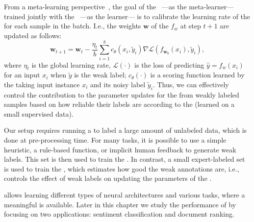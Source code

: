 From a meta-learning perspective~\citep{Andrychowicz:2016,Finn2017:ICML,Ravi:2016}, the goal of the \cnet\ ---as the meta-learner--- trained jointly with the \tnet\ ---as the learner--- is to calibrate the learning rate of the \tnet for each sample in the batch. I.e., the weights $\pmb{w}$ of the \tnet $f_w$ at step $t+1$ are updated as follows:
\begin{equation}
\pmb{w}_{t+1} = \pmb{w}_t - \frac{\eta_t}{b}\sum_{i=1}^b c_{\theta}(x_i, \tilde{y}_i)  \nabla \mathcal{L}(f_{\pmb{w_t}}(x_i), \tilde{y}_i),
\end{equation}
where $\eta_t$ is the global learning rate, $\mathcal{L}(\cdot)$ is the loss of predicting $\hat{y}=f_w(x_i)$ for an input $x_i$ when $\tilde{y}$ is the weak label; $c_\theta(\cdot)$ is a scoring function learned by the \cnet taking input instance $x_i$ and its noisy label $\tilde{y}_i$. Thus, we can effectively control the contribution to the parameter updates for the \tnet from weakly labeled samples based on how reliable their labels are according to the \cnet (learned on a small supervised data).

Our setup requires running a \wa to label a large amount of unlabeled data, which is done at pre-processing time. For many tasks, it is possible to use a simple heuristic, a rule-based function, or implicit human feedback to generate weak labels. This set is then used to train the \tnet.  
In contrast, a small expert-labeled set is used to train the \cnet, which estimates how good the weak annotations are, i.e., controls the effect of weak labels on updating the parameters of the \tnet.

\cws allows learning different types of neural architectures and various tasks, where a meaningful \wa is available. 
Later in this chapter we study the performance of \cws by focusing on two applications: sentiment classification and document ranking. 

